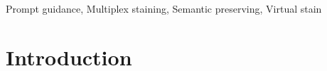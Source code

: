 \documentclass[journal,twoside,web]{ieeecolor}
\begin{document}
\begin{abstract}
\end{abstract}

\begin{IEEEkeywords}
Prompt guidance, Multiplex staining, Semantic preserving, Virtual stain
\end{IEEEkeywords}

\section{Introduction}
\label{sec:introduction}
\end{document}
